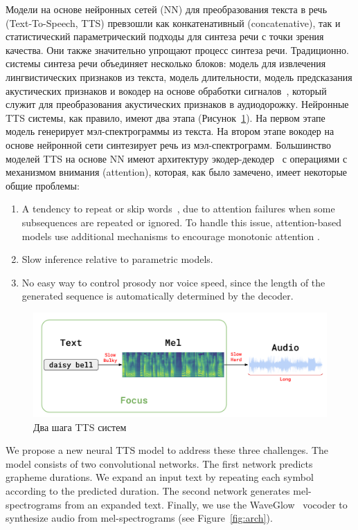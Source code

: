 Модели на основе нейронных сетей (NN) для преобразования текста в речь (Text-To-Speech, TTS) превзошли как конкатенативный (concatenative), так и статистический параметрический подходы для синтеза речи с точки зрения качества. Они также значительно упрощают процесс синтеза речи. Традиционно. системы синтеза речи объединяет несколько блоков: модель для извлечения лингвистических признаков из текста, модель длительности, модель предсказания акустических признаков и вокодер на основе обработки сигналов~\cite{taylor}, который служит для преобразования акустических признаков в аудиодорожку. Нейронные TTS системы, как правило, имеют два этапа (Рисунок~\ref{fig:tts-pipeline}). На первом этапе модель генерирует мэл-спектрограммы из текста. На втором этапе вокодер на основе нейронной сети синтезирует речь из мэл-спектрограмм. Большинство моделей TTS на основе NN имеют архитектуру экодер-декодер~\cite{bahdanau} с операциями с механизмом внимания (attention), которая, как было замечено, имеет некоторые общие проблемы:
\begin{enumerate}
    \item A tendency to repeat or skip words~\cite{fastspeech}, due to attention failures when some sub\-sequences are repeated or ignored. To handle this issue, attention-based models use additional mechanisms to encourage monotonic attention \cite{tacotron2,deepvoice3,taigman2017}.
    \item Slow inference relative to parametric models.
    \item No easy way to control prosody nor voice speed, since the length of the generated sequence is automatically determined by the decoder.
\end{enumerate}

\begin{figure}[!ht]
\centering
\includegraphics[width=1.0\textwidth]{images/tts-pipeline.png}
\caption{Два шага TTS систем}
\label{fig:tts-pipeline}
\end{figure}

We propose a new neural TTS model to address these three challenges. The model consists of two convolutional networks. The first network predicts grapheme durations. We expand an input text by repeating each symbol according to the predicted duration. The second network generates mel-spectrograms from an expanded text. Finally, we use the WaveGlow~\cite{waveglow} vocoder to synthesize audio from mel-spectrograms (see Figure~\ref{fig:arch}).

